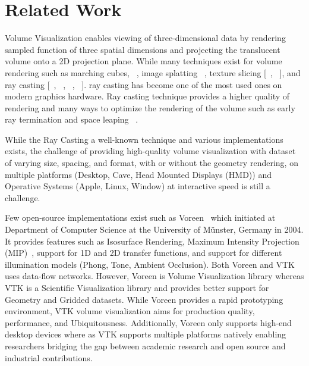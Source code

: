 \section{Related Work}
\label{relatedwork}

Volume Visualization enables viewing of three-dimensional data by rendering
sampled function of three spatial dimensions and projecting the translucent
volume onto a 2D projection plane. While many techniques exist for volume
rendering such as marching cubes, ~\citep{lorensen1987marching},
image splatting  ~\citep{westover1990footprint}, texture slicing
[~\citep{rezk2000interactive}, ~\citep{engel2001high}], and ray casting
[~\citep{hsu1993segmented}, ~\citep{ma1995parallel}, ~\citep{ma1997scalable},
~\citep{heng2006gpu}]. ray casting has become one of the most used ones on
modern graphics hardware. Ray casting technique provides a higher quality
of rendering and many ways to optimize the rendering of the volume such
as early ray termination and space leaping ~\citep{yagel1993accelerating}.

While the Ray Casting a well-known technique and various implementations
exists, the challenge of providing high-quality volume visualization with
dataset of varying size, spacing, and format, with or without the geometry
rendering, on multiple platforms (Desktop, Cave, Head Mounted Displays (HMD))
and Operative Systems (Apple, Linux, Window) at interactive speed is still a challenge.

Few open-source implementations exist such as Voreen~\citep{MRMH09} which
initiated at Department of Computer Science at the University of Münster, Germany in 2004.
It provides features such as Isosurface Rendering,
Maximum Intensity Projection (MIP)~\citep{wallis1989three},
support for 1D and 2D transfer functions, and support for different illumination models
(Phong, Tone, Ambient Occlusion). Both Voreen and VTK uses data-flow networks. However,
Voreen is Volume Visualization library whereas VTK is a Scientific Visualization
library and provides better support for Geometry and Gridded datasets. While Voreen
provides a rapid prototyping environment, VTK volume visualization aims for production
quality, performance, and Ubiquitousness. Additionally, Voreen
only supports high-end desktop devices where as VTK supports multiple platforms
natively enabling researchers bridging the gap between academic research
and open source and industrial contributions.

